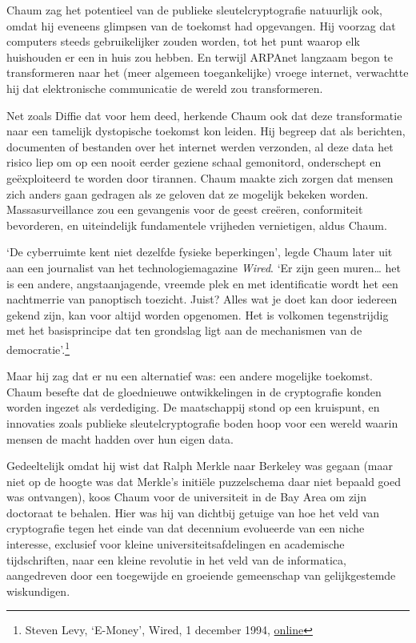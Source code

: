 \documentclass[smalldemyvopaper,11pt,twoside,onecolumn,openright,extrafontsizes,hidelinks]{memoir}
\begin{document}
Chaum zag het potentieel van de publieke sleutelcryptografie natuurlijk
ook, omdat hij eveneens glimpsen van de toekomst had opgevangen. Hij
voorzag dat computers steeds gebruikelijker zouden worden, tot het punt
waarop elk huishouden er een in huis zou hebben. En terwijl ARPAnet
langzaam begon te transformeren naar het (meer algemeen toegankelijke)
vroege internet, verwachtte hij dat elektronische communicatie de wereld
zou transformeren.

Net zoals Diffie dat voor hem deed, herkende Chaum ook dat deze
transformatie naar een tamelijk dystopische toekomst kon leiden. Hij
begreep dat als berichten, documenten of bestanden over het internet
werden verzonden, al deze data het risico liep om op een nooit eerder
geziene schaal gemonitord, onderschept en geëxploiteerd te worden door
tirannen. Chaum maakte zich zorgen dat mensen zich anders gaan gedragen
als ze geloven dat ze mogelijk bekeken worden. Massasurveillance zou een
gevangenis voor de geest creëren, conformiteit bevorderen, en
uiteindelijk fundamentele vrijheden vernietigen, aldus Chaum.

`De cyberruimte kent niet dezelfde fysieke beperkingen', legde Chaum
later uit aan een journalist van het technologiemagazine \emph{Wired}.
`Er zijn geen muren\ldots{} het is een andere, angstaanjagende, vreemde
plek en met identificatie wordt het een nachtmerrie van panoptisch
toezicht. Juist? Alles wat je doet kan door iedereen gekend zijn, kan
voor altijd worden opgenomen. Het is volkomen tegenstrijdig met het
basisprincipe dat ten grondslag ligt aan de mechanismen van de
democratie'.\footnote{Steven Levy, `E-Money', Wired, 1 december 1994,
  \href{https://www.wired.com/1994/12/emoney/.}{online}}

Maar hij zag dat er nu een alternatief was: een andere mogelijke
toekomst. Chaum besefte dat de gloednieuwe ontwikkelingen in de
cryptografie konden worden ingezet als verdediging. De maatschappij
stond op een kruispunt, en innovaties zoals publieke sleutelcryptografie
boden hoop voor een wereld waarin mensen de macht hadden over hun eigen
data.

Gedeeltelijk omdat hij wist dat Ralph Merkle naar Berkeley was gegaan
(maar niet op de hoogte was dat Merkle's initiële puzzelschema daar niet
bepaald goed was ontvangen), koos Chaum voor de universiteit in de Bay
Area om zijn doctoraat te behalen. Hier was hij van dichtbij getuige van
hoe het veld van cryptografie tegen het einde van dat decennium
evolueerde van een niche interesse, exclusief voor kleine
universiteitsafdelingen en academische tijdschriften, naar een kleine
revolutie in het veld van de informatica, aangedreven door een
toegewijde en groeiende gemeenschap van gelijkgestemde wiskundigen.
\end{document}
